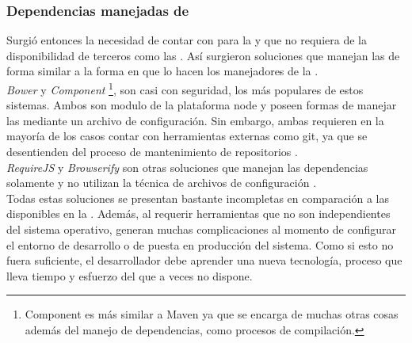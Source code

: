 \subsubsection{Dependencias manejadas de \viewtier}
\label{susubbsec:intro:jvm_dev:view_managed}

Surgió entonces la necesidad de contar con \depmgrs para
la \viewtier y que no requiera de la disponibilidad de terceros como las \cdns.
Así surgieron soluciones que manejan las \dependencies de forma similar a la
forma en que lo hacen los manejadores de la \logictier.\\
\emph{Bower} y \emph{Component} \footnote{
	Component es más similar a Maven ya que se encarga de muchas
	otras cosas además del manejo de dependencias, como procesos de compilación.
}, son casi con seguridad, los más populares de estos sistemas. Ambos son modulo de
la plataforma \gls{node} y poseen formas de manejar las \dependencies mediante un
archivo de configuración. Sin embargo, ambas requieren en la mayoría de los casos
contar con herramientas externas como git, ya que se desentienden del proceso de
mantenimiento de repositorios \cite{Bower:ONLINE}.\\
\emph{RequireJS} y \emph{Browserify} son otras soluciones que manejan las dependencias
\js solamente y no utilizan la técnica de archivos de configuración
.\\
Todas estas soluciones se presentan bastante incompletas en comparación a las
disponibles en la \viewtier. Además, al requerir herramientas que no son
independientes del sistema operativo, generan muchas complicaciones al momento
de configurar el entorno de desarrollo o de puesta en producción del sistema.
Como si esto no fuera suficiente, el desarrollador debe aprender una nueva
tecnología, proceso que lleva tiempo y esfuerzo del que a veces no dispone.
